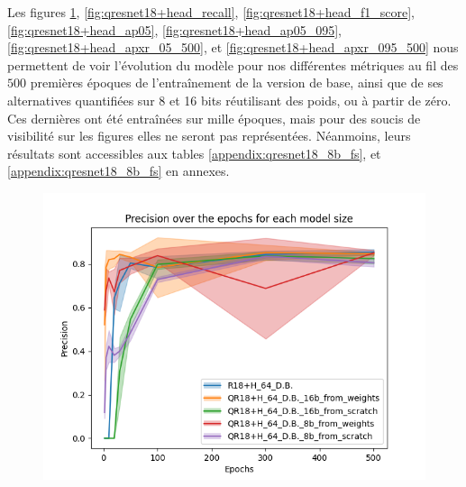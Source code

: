 Les figures \ref{fig:qresnet18+head_precision}, \ref{fig:qresnet18+head_recall}, \ref{fig:qresnet18+head_f1_score}, \ref{fig:qresnet18+head_ap05}, \ref{fig:qresnet18+head_ap05_095}, \ref{fig:qresnet18+head_apxr_05_500}, et \ref{fig:qresnet18+head_apxr_095_500} nous permettent de voir l'évolution du modèle pour nos différentes métriques au fil des $500$ premières époques de l'entraînement de la version de base, ainsi que de ses alternatives quantifiées sur 8 et 16 bits réutilisant des poids, ou à partir de zéro. Ces dernières ont été entraînées sur mille époques, mais pour des soucis de visibilité sur les figures elles ne seront pas représentées. Néanmoins, leurs résultats sont accessibles aux tables \ref{appendix:qresnet18_8b_fs}, et \ref{appendix:qresnet18_8b_fs} en annexes.

\begin{figure}[!htbp]
    \centering
    \begin{minipage}[t]{.5\textwidth}%
      \centering
      \includegraphics[width=1.1\linewidth]{Figures/results/qresnet18+head/qr18+h_precision_over_epochs_500.png}
      \label{fig:qresnet18+head_precision}
    \end{minipage}%
    \begin{minipage}[t]{.5\textwidth}%
      \centering

\end{minipage}
\end{figure}
